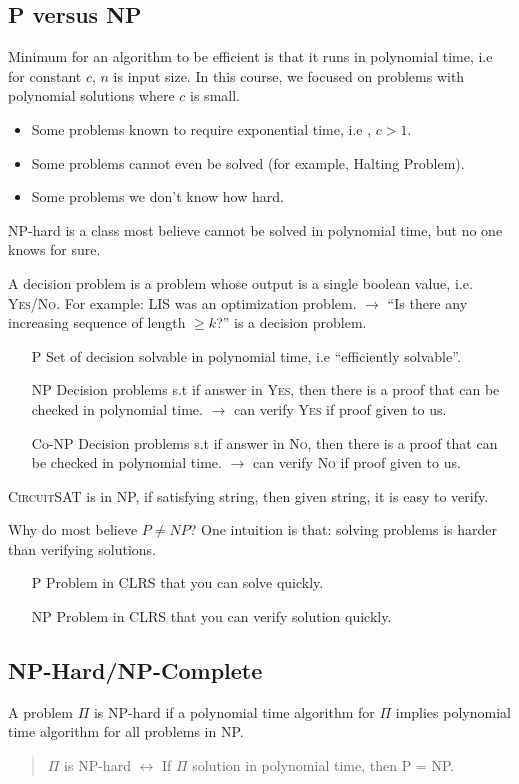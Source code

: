 \subsection{P versus NP}
Minimum for an algorithm to be efficient is that it runs in polynomial time,
i.e  for constant $c$, $n$ is input size.
In this course, we focused on problems with polynomial solutions where $c$ is small.
\begin{itemize}
    \item Some problems known to require exponential time, i.e , $c>1$.
    \item Some problems cannot even be solved (for example, Halting Problem).
    \item Some problems we don't know how hard.
\end{itemize}
NP-hard is a class most believe cannot be solved in polynomial time,
but no one knows for sure.

A decision problem is a problem whose output is a single boolean value,
i.e. \textsc{Yes/No}.
For example: LIS was an optimization problem. $\rightarrow$ ``Is there any increasing sequence of length $\geq k$?''
is a decision problem.
\begin{itemize}
    \item[P] Set of decision solvable in polynomial time, i.e ``efficiently solvable''.
    \item[NP] Decision problems s.t if answer in \textsc{Yes}, then there is a proof
        that can be checked in polynomial time. $\rightarrow$ can verify \textsc{Yes} if proof given to us.
    \item[Co-NP] Decision problems s.t if answer in \textsc{No}, then there is a proof
        that can be checked in polynomial time. $\rightarrow$ can verify \textsc{No} if proof given to us.
\end{itemize}
\textsc{CircuitSAT} is in NP, if satisfying string, then given string, it is easy to verify.

Why do most believe $P \neq NP$?
One intuition is that: solving problems is harder than verifying solutions.
\begin{itemize}
    \item[P] Problem in CLRS that you can solve quickly.
    \item[NP] Problem in CLRS that you can verify solution quickly.
\end{itemize}

\subsection{NP-Hard/NP-Complete}
A problem $\Pi$ is NP-hard if a polynomial time algorithm for $\Pi$ implies
polynomial time algorithm for all problems in NP.
\begin{quote}
    $\Pi$ is NP-hard $\leftrightarrow$ If $\Pi$ solution in polynomial time, then P = NP.
\end{quote}

